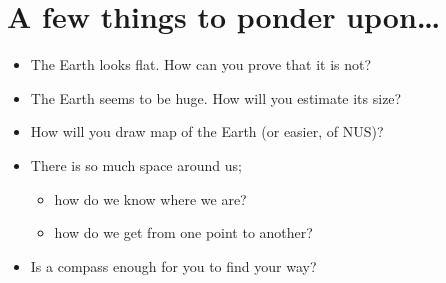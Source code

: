 \documentclass[landscape,DIV=18,a3paper,10pt]{article}
\newcommand{\answer}[2][0.125]{
\ifbool{showAll}{%
\underline{\parbox{#1\linewidth}{\color{myGreen}\centering #2}}}
{%
\underline{\tikz{\useasboundingbox (0,0)--+(#1\linewidth,0);}}}
}
\newcommand\abox[1]{
\ifbool{showAll}{%
{\small\color{myGreen}{#1}}
}{%
\smallskip
\tikz{
\draw (0.45\linewidth,0.05\textheight)node[text width=0.9\linewidth,fill=none,draw=none]{\color{white}#1};
}\smallskip

}}
\def\br{\\[10pt]}
\begin{document}
%
%
%
%
%
%
{
\section*{A few things to ponder upon\ldots}
\color{blue!50!black}
	\begin{itemize}
		\item The Earth looks flat. How can you prove that it is not?
		\item The Earth seems to be huge. How will you estimate its size?
		\item How will you draw map of the Earth (or easier, of NUS)?
		\item There is so much space around us;
		\begin{itemize}
			\item how do we know where we are?
			\item how do we get from one point to another?
		\end{itemize}
		\item Is a compass enough for you to find your way?
		
	\end{itemize}
}
\end{document}
